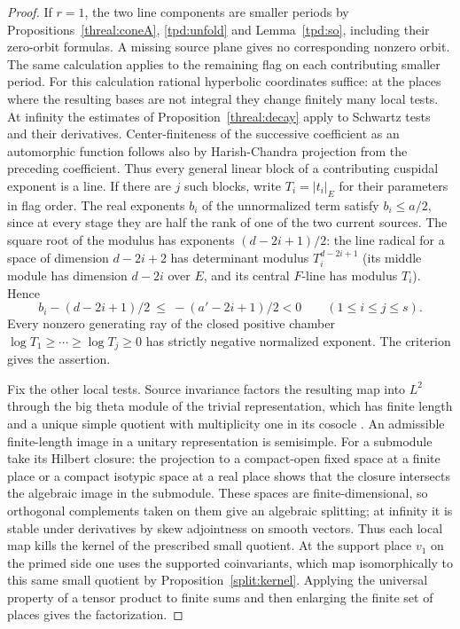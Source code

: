 \begin{proof}
If \(r=1\), the two line components are smaller periods by
Propositions~\ref{threal:coneA}, \ref{tpd:unfold} and
Lemma~\ref{tpd:so}, including their zero-orbit formulas. A missing
source plane gives no corresponding nonzero orbit. The same
calculation applies to the remaining flag on each contributing
smaller period. For this calculation rational hyperbolic coordinates
suffice: at the places where the resulting bases are not integral
they change finitely many local tests. At infinity the estimates of
Proposition~\ref{threal:decay} apply to Schwartz tests and their
derivatives. Center-finiteness of the successive coefficient as an
automorphic function follows also by Harish-Chandra projection from
the preceding coefficient. Thus every general linear block of a
contributing cuspidal exponent is a line. If there are \(j\) such
blocks, write \(T_i=|t_i|_E\) for their parameters in flag order.
The real exponents \(b_i\) of the unnormalized term satisfy
\(b_i\le a/2\), since at every stage they are half the rank of one
of the two current sources. The square root of the modulus has
exponents \((d-2i+1)/2\): the line radical for a space of dimension
\(d-2i+2\) has determinant modulus \(T_i^{d-2i+1}\) (its middle
module has dimension \(d-2i\) over \(E\), and its central
\(F\)-line has modulus \(T_i\)). Hence
\[
        b_i-(d-2i+1)/2\ \le\ -(a'-2i+1)/2<0
        \qquad(1\le i\le j\le s).
\]
Every nonzero generating ray of the closed positive chamber
\(\log T_1\ge\cdots\ge\log T_j\ge0\) has strictly negative
normalized exponent. The criterion gives the assertion.

Fix the other local tests. Source invariance factors the resulting
map into \(L^2\) through the big theta module of the trivial
representation, which has finite length and a unique simple quotient
with multiplicity one in its cosocle
\cite{howeTranscending,ganTakedaHowe,minguezHowe}. An admissible
finite-length image in a unitary representation is semisimple.
For a submodule take its Hilbert closure: the projection to a
compact-open fixed space at a finite place or a compact isotypic
space at a real place shows that the closure intersects the
algebraic image in the submodule. These spaces are finite-dimensional,
so orthogonal complements taken on them give an algebraic splitting;
at infinity it is stable under derivatives by skew adjointness on
smooth vectors. Thus each local map kills the kernel of the prescribed
small quotient. At the support place \(v_1\) on the primed side one
uses the supported coinvariants, which map isomorphically to this
same small quotient by Proposition~\ref{split:kernel}. Applying
the universal property of a tensor product to finite sums and then
enlarging the finite set of places gives the factorization.


\end{proof}
